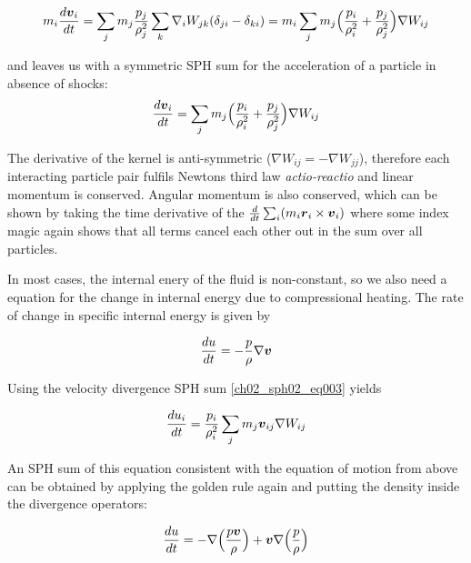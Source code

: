 \begin{equation}
\label{ch02_sph02_eq009}
m_i \frac{d \boldsymbol{v}_i }{dt} = \sum_{j} m_j \frac{p_j}{\rho_j^2} \sum_{k} \nabla_i W_{jk} ( \delta_{ji} - \delta_{ki})\\
 = m_i \sum_{j} m_j \Big( \frac{p_i}{\rho_i^2} + \frac{p_j}{\rho_j^2} \Big) \nabla W_{ij}
\end{equation}

and leaves us with a symmetric SPH sum for the acceleration of a particle in absence of shocks:
\begin{equation}
\label{ch02_sph02_eq010}
\frac{d \boldsymbol{v}_i }{dt} = \sum_{j} m_j \Big( \frac{p_i}{\rho_i^2} + \frac{p_j}{\rho_j^2} \Big) \nabla W_{ij}
\end{equation}

The derivative of the kernel is anti-symmetric ($\nabla W_{ij} = - \nabla W_{jj}$), therefore each interacting particle pair fulfils Newtons third law \emph{actio-reactio} and linear momentum is conserved. Angular momentum is also conserved, which can be shown by taking the time derivative of the $\frac{d}{dt} \sum_i (m_i \boldsymbol{r}_i \times \boldsymbol{v}_i)$ where some index magic \citep{Price:2004p2613} again shows that all terms cancel each other out in the sum over all particles.

In most cases, the internal enery of the fluid is non-constant, so we also need a equation for the change in internal energy due to compressional heating.
The rate of change in specific internal energy is given by 

\begin{equation}
\label{ch02_sph02_eq011}
\frac{du}{dt} = -\frac{p}{\rho} \nabla \boldsymbol{v}
\end{equation}

Using the velocity divergence SPH sum \ref{ch02_sph02_eq003}  yields

\begin{equation}
\label{ch02_sph02_eq012}
\frac{du_i}{dt} = \frac{p_i}{\rho_i^2} \sum_{j} m_j \boldsymbol{v}_{ij}  \nabla W_{ij}
\end{equation}

An SPH sum of this equation consistent with the equation of motion from above can be obtained by applying the golden rule again and putting the density inside the divergence operators:

\begin{equation}
\label{ch02_sph02_eq013}
\frac{du}{dt} = - \nabla \Big( \frac{p \boldsymbol{v}}{\rho} \Big) + \boldsymbol{v} \nabla \Big( \frac{p}{\rho} \Big)
\end{equation}

